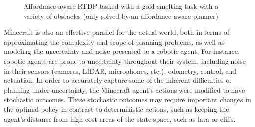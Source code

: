 \documentclass[conference]{IEEEtran}
\begin{document}
\begin{figure}
\centering
{}%
%
%
%
  \caption{Affordance-aware RTDP tasked with a gold-smelting task with a variety of obstacles
  (only solved by an affordance-aware planner)}
  \label{fig:epicworld}
\end{figure}

Minecraft is also an effective parallel for the actual world, both
in terms of approximating the complexity and scope of planning
problems, as well as modeling the uncertainty and noise presented to a
robotic agent.  For instance, robotic agents are prone to
uncertainty throughout their system, including noise in their
sensors (cameras, LIDAR, microphones, etc.), odometry, control, and
actuation.  In order to accurately capture some of the inherent
difficulties of planning under uncertainty, the Minecraft agent's
actions were modified to have stochastic outcomes. These stochastic
outcomes may require important changes in the optimal policy in
contrast to deterministic actions, such as keeping the agent's
distance from high cost areas of the state-space, such as lava or cliffs.
\end{document}
